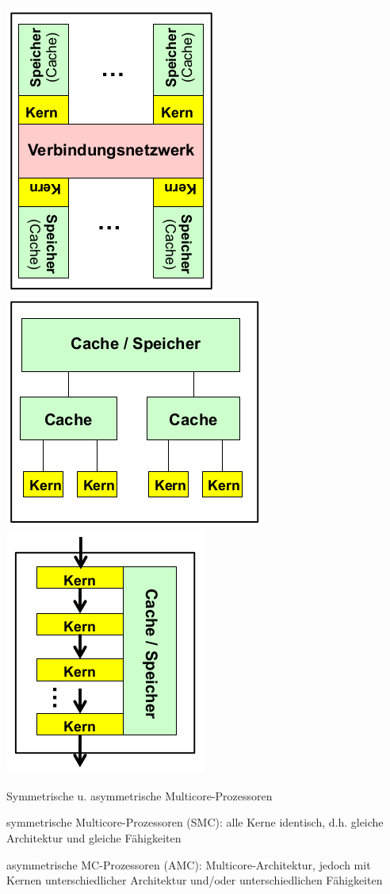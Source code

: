 \documentclass[a4paper]{article}
\begin{document}
\begin{multicols}{3}
\begin{center}
    \includegraphics[width=.3\linewidth]{Assets/AdvancedOperatingSystems-multicore-prozessoren.png}
    \includegraphics[width=.3\linewidth]{Assets/AdvancedOperatingSystems-multicore-prozessoren-2.png}
    \includegraphics[width=.3\linewidth]{Assets/AdvancedOperatingSystems-multicore-prozessoren-3.png}
    \end{center}

    Symmetrische u. asymmetrische Multicore-Prozessoren

    \begin{itemize*}
        \item symmetrische Multicore-Prozessoren (SMC): alle Kerne identisch, d.h. gleiche Architektur und gleiche Fähigkeiten
        \item asymmetrische MC-Prozessoren (AMC): Multicore-Architektur, jedoch mit Kernen unterschiedlicher Architektur
        und/oder unterschiedlichen Fähigkeiten
    \end{itemize*}


\end{multicols}
\end{document}

